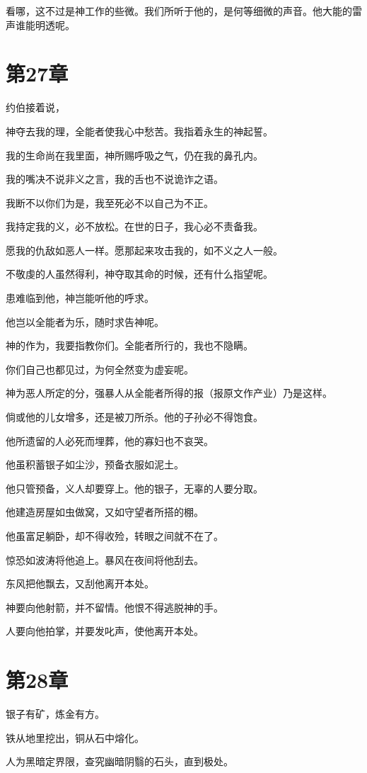 \documentclass[12pt,oneside]{book}
\begin{document}
看哪，这不过是神工作的些微。我们所听于他的，是何等细微的声音。他大能的雷声谁能明透呢。


\chapter{第27章}
约伯接着说，

神夺去我的理，全能者使我心中愁苦。我指着永生的神起誓。

我的生命尚在我里面，神所赐呼吸之气，仍在我的鼻孔内。

我的嘴决不说非义之言，我的舌也不说诡诈之语。

我断不以你们为是，我至死必不以自己为不正。

我持定我的义，必不放松。在世的日子，我心必不责备我。

愿我的仇敌如恶人一样。愿那起来攻击我的，如不义之人一般。

不敬虔的人虽然得利，神夺取其命的时候，还有什么指望呢。

患难临到他，神岂能听他的呼求。

他岂以全能者为乐，随时求告神呢。

神的作为，我要指教你们。全能者所行的，我也不隐瞒。

你们自己也都见过，为何全然变为虚妄呢。

神为恶人所定的分，强暴人从全能者所得的报（报原文作产业）乃是这样。

倘或他的儿女增多，还是被刀所杀。他的子孙必不得饱食。

他所遗留的人必死而埋葬，他的寡妇也不哀哭。

他虽积蓄银子如尘沙，预备衣服如泥土。

他只管预备，义人却要穿上。他的银子，无辜的人要分取。

他建造房屋如虫做窝，又如守望者所搭的棚。

他虽富足躺卧，却不得收殓，转眼之间就不在了。

惊恐如波涛将他追上。暴风在夜间将他刮去。

东风把他飘去，又刮他离开本处。

神要向他射箭，并不留情。他恨不得逃脱神的手。

人要向他拍掌，并要发叱声，使他离开本处。


\chapter{第28章}
银子有矿，炼金有方。

铁从地里挖出，铜从石中熔化。

人为黑暗定界限，查究幽暗阴翳的石头，直到极处。
\end{document}
